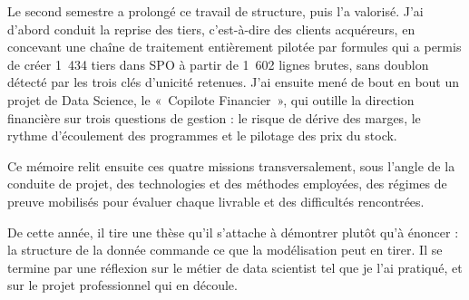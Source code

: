 Le second semestre a prolongé ce travail de structure, puis l'a valorisé. J'ai d'abord conduit
la reprise des tiers, c'est-à-dire des clients acquéreurs, en concevant une chaîne de traitement
entièrement pilotée par formules qui a permis de créer 1~434 tiers dans SPO à partir de 1~602
lignes brutes, sans doublon détecté par les trois clés d'unicité retenues. J'ai ensuite mené de
bout en bout un projet de Data Science, le «~Copilote Financier~», qui outille la direction
financière sur trois questions de gestion : le risque de dérive des marges, le rythme
d'écoulement des programmes et le pilotage des prix du stock.

Ce mémoire relit ensuite ces quatre missions transversalement, sous l'angle de la conduite de
projet, des technologies et des méthodes employées, des régimes de preuve mobilisés pour
évaluer chaque livrable et des difficultés rencontrées.

De cette année, il tire une thèse qu'il s'attache à démontrer plutôt qu'à énoncer : la
structure de la donnée commande ce que la modélisation peut en tirer. Il se termine par
une réflexion sur le métier de data scientist tel que je l'ai pratiqué, et sur le projet
professionnel qui en découle.
